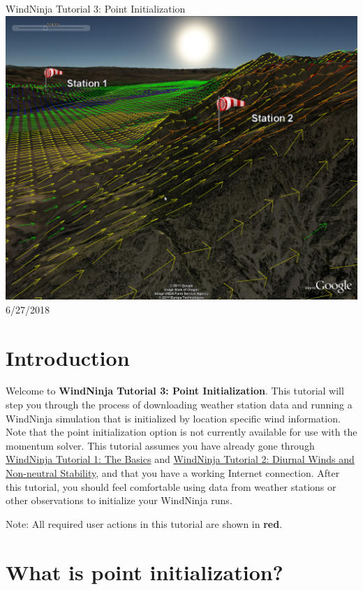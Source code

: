 \documentclass[12pt]{article}
\begin{document}
\begin{titlepage}
    \centering
    {\Huge
       WindNinja Tutorial 3: Point Initialization
    }    
    \vfill
    \includegraphics[scale=0.35]							{title_fig}
    \vfill
  	{\Huge
	  6/27/2018 %
  	}
    \vfill
\end{titlepage}
\section*{Introduction}

Welcome to \textbf{WindNinja Tutorial 3: Point Initialization}.  This tutorial will step you through the process of downloading weather station data and running a WindNinja simulation that is initialized by location specific wind information.  Note that the point initialization option is not currently available for use with the momentum solver. This tutorial assumes you have already gone through \href{http://firelab.github.io/windninja/pdf/WindNinja_tutorial1.pdf}{WindNinja Tutorial 1: The Basics} and \href{http://firelab.github.io/windninja/pdf/WindNinja_tutorial2.pdf}{WindNinja Tutorial 2: Diurnal Winds and Non-neutral Stability}, and that you have a working Internet connection. After this tutorial, you should feel comfortable using data from weather stations or other observations to initialize your WindNinja runs.

Note:  All required user actions in this tutorial are shown in \textbf{\color{red}red}.

\section*{What is point initialization?}
\end{document}
